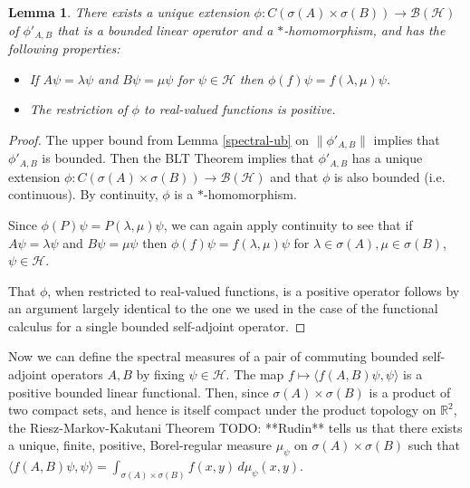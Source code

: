 \documentclass[12pt,oneside]{report}
\newtheorem{lem}[thm]{Lemma}
\begin{document}
\begin{lem}
    There exists a unique extension $\phi: C(\sigma(A) \times \sigma(B)) \to \mathscr{B}(\mathscr{H})$ of $\phi'_{A,B}$ that is a bounded linear operator and a $*$-homomorphism, and has the following properties:
    \begin{itemize}
        \item If $A\psi = \lambda \psi$ and $B\psi = \mu \psi$ for $\psi \in \mathscr{H}$ then $\phi(f)\psi = f(\lambda,\mu)\psi$.
        \item The restriction of $\phi$ to real-valued functions is positive.
    \end{itemize}
\end{lem}
\begin{proof}
    The upper bound from Lemma \ref{spectral-ub} on $\|\phi'_{A,B}\|$ implies that $\phi'_{A,B}$ is bounded. Then the BLT Theorem implies that $\phi'_{A,B}$ has a unique extension $\phi: C(\sigma(A) \times \sigma(B)) \to \mathscr{B}(\mathscr{H})$ and that $\phi$ is also bounded (i.e. continuous). By continuity, $\phi$ is a $*$-homomorphism.

    Since $\phi(P)\psi = P(\lambda,\mu)\psi$, we can again apply continuity to see that if $A\psi = \lambda \psi$ and $B\psi = \mu \psi$ then $\phi(f)\psi = f(\lambda,\mu)\psi$ for $\lambda \in \sigma(A), \mu \in \sigma(B)$, $\psi \in \mathscr{H}$.

    That $\phi$, when restricted to real-valued functions, is a positive operator follows by an argument largely identical to the one we used in the case of the functional calculus for a single bounded self-adjoint operator.
\end{proof}

Now we can define the spectral measures of a pair of commuting bounded self-adjoint operators $A,B$ by fixing $\psi \in \mathscr{H}$. The map $f \mapsto \langle f(A,B) \psi, \psi \rangle$ is a positive bounded linear functional. Then, since $\sigma(A) \times \sigma(B)$ is a product of two compact sets, and hence is itself compact under the product topology on $\mathbb{R}^{2}$, the Riesz-Markov-Kakutani Theorem TODO: **Rudin** tells us that there exists a unique, finite, positive, Borel-regular measure $\mu_{\psi}$ on $\sigma(A) \times \sigma(B)$ such that $\langle f(A,B) \psi, \psi \rangle = \int _{\sigma(A) \times \sigma(B)} f(x,y) \, d\mu_{\psi}(x,y)$.
\end{document}
